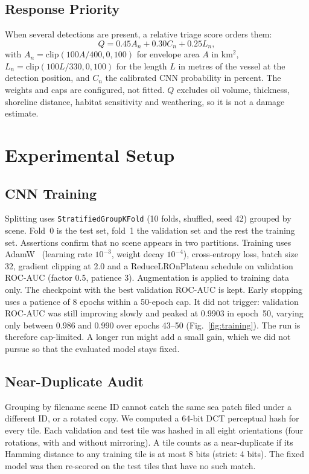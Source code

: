 \documentclass[conference]{IEEEtran}
\begin{document}
\subsection{Response Priority}
When several detections are present, a relative triage score orders them:
\begin{equation}
Q=0.45A_n+0.30C_n+0.25L_n,
\label{eq:priority}
\end{equation}
with $A_n=\mathrm{clip}(100A/400,0,100)$ for envelope area $A$ in km$^2$,
$L_n=\mathrm{clip}(100L/330,0,100)$ for the length $L$ in metres of the vessel at the
detection position, and $C_n$ the calibrated CNN probability in percent. The weights and
caps are configured, not fitted. $Q$ excludes oil volume, thickness, shoreline distance,
habitat sensitivity and weathering, so it is not a damage estimate.

\section{Experimental Setup}

\subsection{CNN Training}
Splitting uses \texttt{StratifiedGroupKFold} (10 folds, shuffled, seed 42) grouped by
scene. Fold~0 is the test set, fold~1 the validation set and the rest the training set.
Assertions confirm that no scene appears in two partitions. Training uses AdamW~\cite{loshchilov2019}
(learning rate $10^{-3}$, weight decay $10^{-4}$), cross-entropy loss, batch size 32,
gradient clipping at 2.0 and a ReduceLROnPlateau schedule on validation ROC-AUC
(factor 0.5, patience 3). Augmentation is applied to training data only. The checkpoint
with the best validation ROC-AUC is kept. Early stopping uses a patience of 8 epochs
within a 50-epoch cap. It did not trigger: validation ROC-AUC was still improving
slowly and peaked at 0.9903 in epoch~50, varying only between 0.986 and 0.990 over
epochs 43--50 (Fig.~\ref{fig:training}). The run is therefore cap-limited. A longer run
might add a small gain, which we did not pursue so that the evaluated model stays fixed.

\subsection{Near-Duplicate Audit}
Grouping by filename scene ID cannot catch the same sea patch filed under a different
ID, or a rotated copy. We computed a 64-bit DCT perceptual hash for every tile. Each
validation and test tile was hashed in all eight orientations (four rotations, with and
without mirroring). A tile counts as a near-duplicate if its Hamming distance to any
training tile is at most 8 bits (strict: 4 bits). The fixed model was then re-scored on
the test tiles that have no such match.
\end{document}
